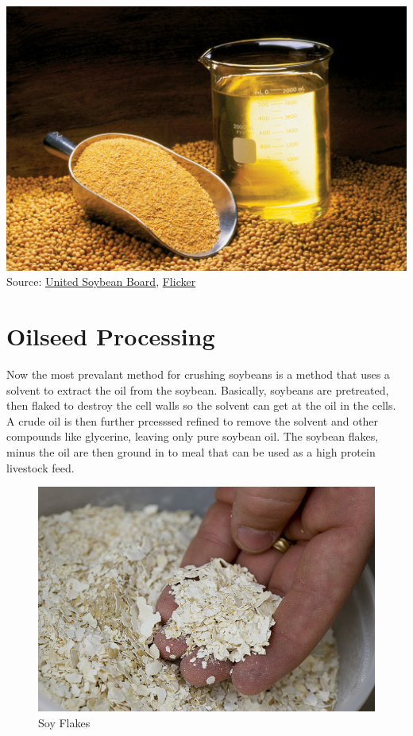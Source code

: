 \documentclass[]{book}
\theoremstyle{definition}
\theoremstyle{definition}
\theoremstyle{remark}
\begin{document}
\includegraphics{images/soyoilmeal_checkoff.jpg} Source:
\href{http://unitedsoybean.org/}{United Soybean Board},
\href{https://www.flickr.com/photos/unitedsoybean/10059732523/in/photolist-gjWL1c-iSHsD6-gjRZN5-gjSiez-gjRDSm-3GTus-gjT5Pf-gjT5FQ-gjT5Zf-iRrGux-5mxrJp-iRuCDS-fEhEb4-iSHt56-gjSLAj-gjTptX-gjSLDL-gjSNeR-gjSLEC-gjT72q-6m2BCX-gjSUHT-gjTpzi-6m6Jay-qBtpPq-5wBq3U-gjWLbe-aMpXNc-qRDdLA-gjWY8m-rujuvk-iRqECD-rNDaeg-GL7Qd-6m2Yyc-6JGi4H-ar3khU-cNjfUf-6m2A3g-aE4dw4-c3VUt9-c3VVq5-4JzMWS-6KY45z-6m2Xsv-6m6Eny-6m2XZg-6m2WVa-6m2ZFF-6m7ad1}{Flicker}

\section{Oilseed Processing}\label{oilseed-processing}

Now the most prevalant method for crushing soybeans is a method that
uses a solvent to extract the oil from the soybean. Basically, soybeans
are pretreated, then flaked to destroy the cell walls so the solvent can
get at the oil in the cells. A crude oil is then further prcesssed
refined to remove the solvent and other compounds like glycerine,
leaving only pure soybean oil. The soybean flakes, minus the oil are
then ground in to meal that can be used as a high protein livestock
feed.

\begin{figure}[htbp]
\centering
\includegraphics{images/soyflakes.jpg}
\caption{Soy Flakes}
\end{figure}
\end{document}
